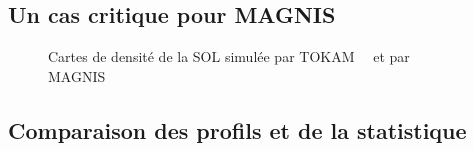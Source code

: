 \begin{refsection}
\subsection{Un cas critique pour MAGNIS}

\begin{figure}[htbp]
  \centering
    \caption{Cartes de densité de la SOL simulée par
    TOKAM~~ et par MAGNIS~}
    \label{pandas}
\end{figure}
\subsection{Comparaison des profils et de la statistique}


\end{refsection}
